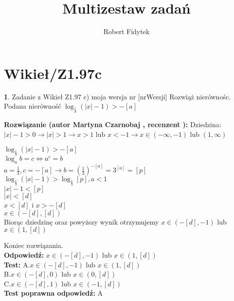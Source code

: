 \documentclass[12pt, a4paper]{article}
\title{Multizestaw zadań}
\author{Robert Fidytek}
\date{}
\theoremstyle{definition} %
\newtheorem{zad}{}
\newcommand{\kategoria}[1]{\section{#1}} %
\newcommand{\zadStart}[1]{\begin{zad}#1\newline} %
\newcommand{\zadStop}{\end{zad}}   %
\newcommand{\rozwStart}[2]{\noindent \textbf{Rozwiązanie (autor #1 , recenzent #2): }\newline} %
\newcommand{\rozwStop}{\newline}                                            %
\newcommand{\odpStart}{\noindent \textbf{Odpowiedź:}\newline}    %
\newcommand{\odpStop}{\newline}                                             %
\newcommand{\testStart}{\noindent \textbf{Test:}\newline} %
\newcommand{\testStop}{\newline} %
\newcommand{\kluczStart}{\noindent \textbf{Test poprawna odpowiedź:}\newline} %
\newcommand{\kluczStop}{\newline} %
\begin{document}
\maketitle


\kategoria{Wikieł/Z1.97c}
\zadStart{Zadanie z Wikieł Z1.97 c) moja wersja nr [nrWersji]}
Rozwiąż nierównośc.\\
Podana nierówność $ \log_{\frac{1}{3}} (|x| - 1) > -[a]$\\
\zadStop
\rozwStart{Martyna Czarnobaj}{}
Dziedzina: $ |x|-1 > 0 \rightarrow |x|>1 \rightarrow x>1$ lub $x<-1 \rightarrow x \in (-\infty,-1)$ lub $(1,\infty) $\\
\begin{center}
	$ \log_{\frac{1}{3}} (|x| - 1) > -[a]$\\
	$ \log_{a} b = c \Leftrightarrow a^{c}=b$\\
	$ a = \frac{1}{3}, c = -[a] \rightarrow b = (\frac{1}{3})^{-[a]} = 3^{[a]} = 
	[p] $\\
	$ \log_{\frac{1}{3}} (|x| - 1) > \log_{\frac{1}{3}} [p], a < 1 $\\
	$ |x| - 1 < [p] $\\
	$ |x| < [d] $\\
	$ x < [d] $ i $ x > -[d] $\\
	$ x \in (-[d],[d]) $\\
	Biorąc dziedzinę oraz powyższy wynik otrzymujemy $ x \in (-[d], -1) $ lub $ x \in (1,[d]) $\\
\end{center}

Koniec rozwiązania.\\
\rozwStop
\odpStart
$ x \in (-[d], -1) $ lub $ x \in (1,[d])$ \\
\odpStop
\testStart
A.$ x \in (-[d], -1) $ lub $ x \in (1,[d])$ \\
B.$ x \in (-[d], 0) $ lub $ x \in (0,[d])$ \\
C.$ x \in (-[d], 1) $ lub $ x \in (-1,[d])$ \\
\testStop
\kluczStart
A
\kluczStop
\end{document}
